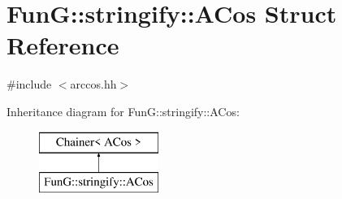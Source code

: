 \hypertarget{structFunG_1_1stringify_1_1ACos}{\section{Fun\-G\-:\-:stringify\-:\-:A\-Cos Struct Reference}
\label{structFunG_1_1stringify_1_1ACos}
}


{\ttfamily \#include $<$arccos.\-hh$>$}

Inheritance diagram for Fun\-G\-:\-:stringify\-:\-:A\-Cos\-:\begin{figure}[H]
\begin{center}
\leavevmode
\includegraphics[height=2.000000cm]{structFunG_1_1stringify_1_1ACos}
\end{center}
\end{figure}
